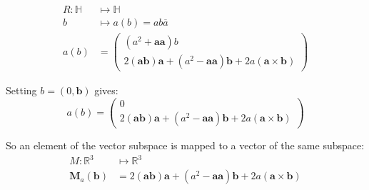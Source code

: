 \documentclass[11pt]{article}
\newcommand{\vvv}[1]{\ensuremath{\begin{pmatrix}#1\end{pmatrix}}}
\begin{document}
\begin{equation}
    \begin{aligned}
        R \colon \mathbb{H} &\mapsto \mathbb{H} \\
        b &\mapsto a(b) = ab\overline{a} \\
        a(b) &= \vvv{
            (a^2 + \mathbf{a}\mathbf{a})b \\
            2(\mathbf{a}\mathbf{b})\mathbf{a} 
            + (a^2 - \mathbf{a}\mathbf{a})\mathbf{b}
            + 2a(\mathbf{a} \times \mathbf{b})
        }
    \end{aligned}   
\end{equation}

Setting $b=(0, \mathbf{b})$ gives:
\begin{equation}
    a(b) = \vvv{
        0 \\
        2(\mathbf{a}\mathbf{b})\mathbf{a} 
        + (a^2 - \mathbf{a}\mathbf{a})\mathbf{b}
        + 2a(\mathbf{a} \times \mathbf{b})
    }
\end{equation}

So an element of the vector subspace is mapped to a vector of the same subspace:
\begin{equation}
    \begin{aligned}
        M \colon \mathbb{R}^3 &\mapsto \mathbb{R}^3 \\
        \mathbf{M}_a(\mathbf{b}) &= 2(\mathbf{a}\mathbf{b})\mathbf{a} 
            + (a^2 - \mathbf{a}\mathbf{a})\mathbf{b}
            + 2a(\mathbf{a} \times \mathbf{b})
    \end{aligned}   
\end{equation}
\end{document}

